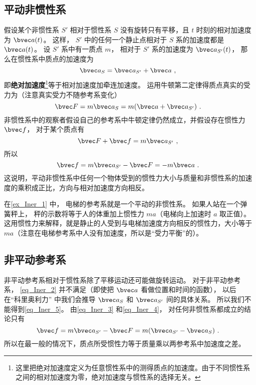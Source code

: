 \subsection{平动非惯性系}
假设某个非惯性系 $S'$ 相对于惯性系 $S$ 没有旋转只有平移，且 $t$ 时刻的相对加速度为 $\bvec a(t)$。 这样， $S'$ 中的任何一个静止点相对于 $S$ 系的加速度都是 $\bvec a(t)$。 设 $S'$ 系中有一质点 $m$， 相对于 $S'$ 系的加速度为 $\bvec a_{S'} (t)$， 那么在惯性系中质点的加速度为
\begin{equation}\label{eq_Iner_2}
\bvec a_{S} = \bvec a_{S'} + \bvec a~,
\end{equation}
即\textbf{绝对加速度}\footnote{这里把绝对加速度定义为任意惯性系中的测得质点的加速度。由于不同惯性系之间的相对加速度为零，绝对加速度与惯性系的选择无关。}等于相对加速度加牵连加速度。 运用牛顿第二定律得质点真实的受力为（注意真实受力不随参考系变化）
\begin{equation}\label{eq_Iner_3}
\bvec F = m \bvec a_{S} = m(\bvec a + \bvec a_{S'} )~.
\end{equation}
非惯性系中的观察者假设自己的参考系中牛顿定律仍然成立，并假设存在惯性力 $\bvec f$， 对于某个质点有
\begin{equation}\label{eq_Iner_4}
\bvec F + \bvec f = m \bvec a_{S'}~,
\end{equation}
所以
\begin{equation}\label{eq_Iner_5}
\bvec f = m \bvec a_{S'} - \bvec F =  - m\bvec a~.
\end{equation}
这说明，平动非惯性系中任何一个物体受到的惯性力大小与质量和非惯性系的加速度的乘积成正比，方向与相对加速度方向相反。

在\autoref{ex_Iner_1} 中， 电梯的参考系就是一个平动的非惯性系。 如果人站在一个弹簧秤上， 秤的示数将等于人的体重加上惯性力 $ma$（电梯向上加速时 $a$ 取正值）。 这用惯性力来解释，就是静止的人受到与电梯加速度方向相反的惯性力，大小等于 $ma$（注意在电梯参考系中人没有加速度，所以是“受力平衡”的）。

\subsection{非平动参考系}

非平动参考系相对于惯性系除了平移运动还可能做旋转运动。 对于非平动参考系， \autoref{eq_Iner_2} 并不满足（即使把 $\bvec a$ 看做位置和时间的函数）， 以后在“科里奥利力” 中我们会推导 $\bvec a_{S}$ 和 $\bvec a_{S'}$ 间的具体关系。 所以我们不能得到\autoref{eq_Iner_5}。 由\autoref{eq_Iner_3} 和\autoref{eq_Iner_4}， 对任何非惯性系都成立的结论只有
\begin{equation}
\bvec f = m \bvec a_{S'} - \bvec F =  m( \bvec a_{S'} - \bvec a_{S})~.
\end{equation}
所以在最一般的情况下，质点所受惯性力等于质量乘以两参考系中加速度之差。

